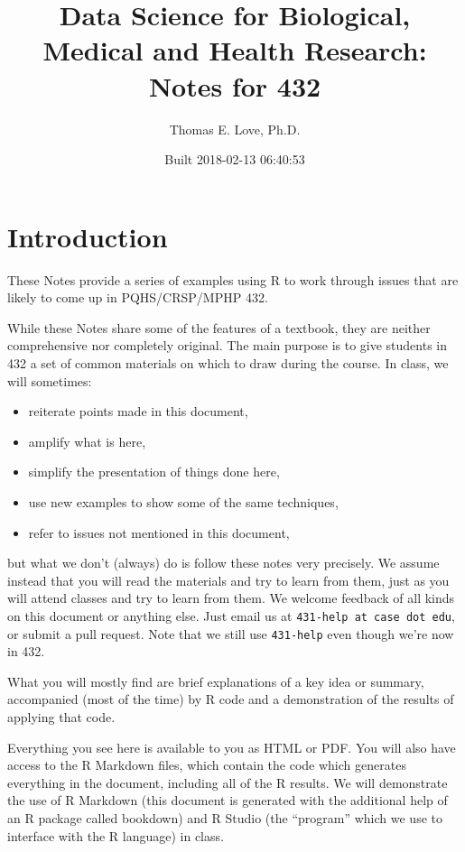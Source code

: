 \documentclass[]{book}
\title{Data Science for Biological, Medical and Health Research: Notes for 432}
\author{Thomas E. Love, Ph.D.}
\date{Built 2018-02-13 06:40:53}
\providecommand{\tightlist}{%
  \setlength{\itemsep}{0pt}\setlength{\parskip}{0pt}}
\theoremstyle{definition}
\theoremstyle{definition}
\theoremstyle{definition}
\theoremstyle{remark}
\begin{document}
\maketitle

{
\setcounter{tocdepth}{1}
\tableofcontents
}
\chapter*{Introduction}\label{introduction}

These Notes provide a series of examples using R to work through issues
that are likely to come up in PQHS/CRSP/MPHP 432.

While these Notes share some of the features of a textbook, they are
neither comprehensive nor completely original. The main purpose is to
give students in 432 a set of common materials on which to draw during
the course. In class, we will sometimes:

\begin{itemize}
\tightlist
\item
  reiterate points made in this document,
\item
  amplify what is here,
\item
  simplify the presentation of things done here,
\item
  use new examples to show some of the same techniques,
\item
  refer to issues not mentioned in this document,
\end{itemize}

but what we don't (always) do is follow these notes very precisely. We
assume instead that you will read the materials and try to learn from
them, just as you will attend classes and try to learn from them. We
welcome feedback of all kinds on this document or anything else. Just
email us at \texttt{431-help\ at\ case\ dot\ edu}, or submit a pull
request. Note that we still use \texttt{431-help} even though we're now
in 432.

What you will mostly find are brief explanations of a key idea or
summary, accompanied (most of the time) by R code and a demonstration of
the results of applying that code.

Everything you see here is available to you as HTML or PDF. You will
also have access to the R Markdown files, which contain the code which
generates everything in the document, including all of the R results. We
will demonstrate the use of R Markdown (this document is generated with
the additional help of an R package called bookdown) and R Studio (the
``program'' which we use to interface with the R language) in class.
\end{document}
